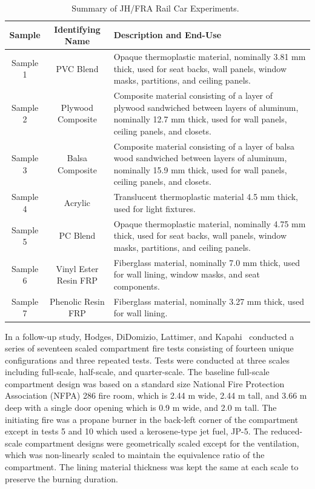 \begin{table}[!htb]
\caption[Summary of JH/FRA Materials]{Summary of JH/FRA Rail Car Experiments.~\cite{Luo:FRA2019}}
\begin{center}
\begin{tabular}{|c|c|p{4in}|}
\hline
Sample & Identifying Name & Description and End-Use \\ \hline \hline
Sample 1    & PVC Blend             & Opaque thermoplastic material, nominally 3.81 mm thick, used for seat backs, wall panels, window masks, partitions, and ceiling panels. \\ \hline
Sample 2    & Plywood Composite     & Composite material consisting of a layer of plywood sandwiched between layers of aluminum, nominally 12.7 mm thick, used for wall panels, ceiling panels, and closets. \\ \hline
Sample 3    & Balsa Composite       & Composite material consisting of a layer of balsa wood sandwiched between layers of aluminum, nominally 15.9 mm thick, used for wall panels, ceiling panels, and closets.  \\ \hline
Sample 4    & Acrylic               & Translucent thermoplastic material 4.5 mm thick, used for light fixtures.  \\ \hline
Sample 5    & PC Blend              & Opaque thermoplastic material, nominally 4.75 mm thick, used for seat backs, wall panels, window masks, partitions, and ceiling panels. \\ \hline
Sample 6    & Vinyl Ester Resin FRP & Fiberglass material, nominally 7.0 mm thick, used for wall lining, window masks, and seat components. \\ \hline
Sample 7    & Phenolic Resin FRP    & Fiberglass material, nominally 3.27 mm thick, used for wall lining. \\ \hline
\end{tabular}
\end{center}
\label{JH_FRA_materials_table}
\end{table}

In a follow-up study, Hodges, DiDomizio, Lattimer, and Kapahi~\cite{Hodges:FRA22} conducted a series of seventeen scaled compartment fire tests consisting of fourteen unique configurations and three repeated tests.
Tests were conducted at three scales including full-scale, half-scale, and quarter-scale.
The baseline full-scale compartment design was based on a standard size National Fire Protection Association (NFPA) 286 fire room, which is 2.44 m wide, 2.44 m tall, and 3.66 m deep with a single door opening which is 0.9 m wide, and 2.0 m tall.
The initiating fire was a propane burner in the back-left corner of the compartment except in tests 5 and 10 which used a kerosene-type jet fuel, JP-5.
The reduced-scale compartment designs were geometrically scaled except for the ventilation, which was non-linearly scaled to maintain the equivalence ratio of the compartment.
The lining material thickness was kept the same at each scale to preserve the burning duration.

